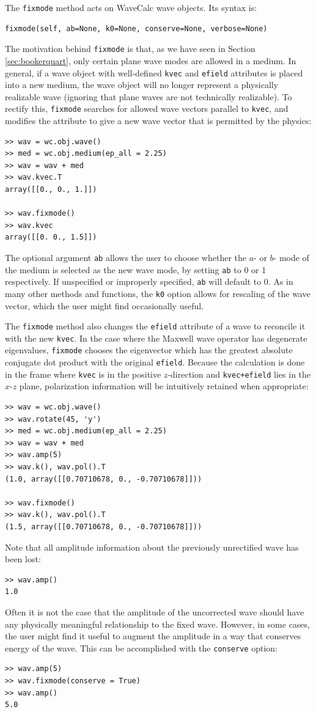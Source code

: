 \documentclass[11pt, reqno]{book}%
\newcounter{ct}
\newcommand{\tw}[1]{{\tt #1}}
\begin{document}
The \tw{fixmode} method acts on WaveCalc wave objects. Its syntax is:
\begin{verbatim}
fixmode(self, ab=None, k0=None, conserve=None, verbose=None)
\end{verbatim}
\noindent The motivation behind \tw{fixmode} is that, as we have seen in Section \ref{sec:bookerquart}, only certain plane wave modes are allowed in a medium. In general, if a wave object with well-defined \tw{kvec} and \tw{efield} attributes is placed into a new medium, the wave object will no longer represent a physically realizable wave (ignoring that plane waves are not technically realizable). To rectify this, \tw{fixmode} searches for allowed wave vectors parallel to \tw{kvec}, and modifies the attribute to give a new wave vector that is permitted by the physics:
\begin{verbatim}
>> wav = wc.obj.wave()
>> med = wc.obj.medium(ep_all = 2.25)
>> wav = wav + med
>> wav.kvec.T
array([[0., 0., 1.]])

>> wav.fixmode()
>> wav.kvec
array([[0. 0., 1.5]])
\end{verbatim}
\noindent The optional argument \tw{ab} allows the user to choose whether the $a$- or $b$- mode of the medium is selected as the new wave mode, by setting \tw{ab} to 0 or 1 respectively. If unspecified or improperly specified, \tw{ab} will default to 0. As in many other methods and functions, the \tw{k0} option allows for rescaling of the wave vector, which the user might find occasionally useful. 

The \tw{fixmode} method also changes the \tw{efield} attribute of a wave to reconcile it with the new \tw{kvec}. In the case where the Maxwell wave operator has degenerate eigenvalues, \tw{fixmode} chooses the eigenvector which has the greatest absolute conjugate dot product with the original \tw{efield}. Because the calculation is done in the frame where \tw{kvec} is in the positive $z$-direction and \tw{kvec+efield} lies in the $x$-$z$ plane, polarization information will be intuitively retained when appropriate:
\begin{verbatim}
>> wav = wc.obj.wave()
>> wav.rotate(45, 'y')
>> med = wc.obj.medium(ep_all = 2.25)
>> wav = wav + med
>> wav.amp(5)
>> wav.k(), wav.pol().T
(1.0, array([[0.70710678, 0., -0.70710678]]))

>> wav.fixmode()
>> wav.k(), wav.pol().T
(1.5, array([[0.70710678, 0., -0.70710678]]))
\end{verbatim}
\noindent Note that all amplitude information about the previously unrectified wave has been lost:
\begin{verbatim}
>> wav.amp()
1.0
\end{verbatim}
\noindent Often it is not the case that the amplitude of the uncorrected wave should have any physically meaningful relationship to the fixed wave. However, in some cases, the user might find it useful to augment the amplitude in a way that conserves energy of the wave. This can be accomplished with the \tw{conserve} option:
\begin{verbatim}
>> wav.amp(5)
>> wav.fixmode(conserve = True)
>> wav.amp()
5.0
\end{verbatim}
\end{document}
